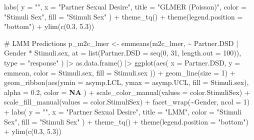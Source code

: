 \documentclass[
  bookmarksnumbered]{article}
\newenvironment{Shaded}{\begin{snugshade}}{\end{snugshade}}
\newcommand{\AttributeTok}[1]{\textcolor[rgb]{0.80,0.80,0.80}{#1}}
\newcommand{\CommentTok}[1]{\textcolor[rgb]{0.50,0.62,0.50}{#1}}
\newcommand{\ConstantTok}[1]{\textcolor[rgb]{0.86,0.64,0.64}{\textbf{#1}}}
\newcommand{\DecValTok}[1]{\textcolor[rgb]{0.86,0.86,0.80}{#1}}
\newcommand{\FloatTok}[1]{\textcolor[rgb]{0.75,0.75,0.82}{#1}}
\newcommand{\FunctionTok}[1]{\textcolor[rgb]{0.94,0.94,0.56}{#1}}
\newcommand{\NormalTok}[1]{\textcolor[rgb]{0.80,0.80,0.80}{#1}}
\newcommand{\OtherTok}[1]{\textcolor[rgb]{0.94,0.94,0.56}{#1}}
\newcommand{\SpecialCharTok}[1]{\textcolor[rgb]{0.86,0.64,0.64}{#1}}
\newcommand{\StringTok}[1]{\textcolor[rgb]{0.80,0.58,0.58}{#1}}
\begin{document}
\begin{Shaded}
\begin{Highlighting}[]
  \FunctionTok{labs}\NormalTok{(}
    \AttributeTok{y =} \StringTok{""}\NormalTok{, }\AttributeTok{x =} \StringTok{"Partner Sexual Desire"}\NormalTok{,}
    \AttributeTok{title =} \StringTok{"GLMER (Poisson)"}\NormalTok{,}
    \AttributeTok{color =} \StringTok{"Stimuli Sex"}\NormalTok{, }\AttributeTok{fill =} \StringTok{"Stimuli Sex"}
\NormalTok{  ) }\SpecialCharTok{+}
  \FunctionTok{theme\_tq}\NormalTok{() }\SpecialCharTok{+}
  \FunctionTok{theme}\NormalTok{(}\AttributeTok{legend.position =} \StringTok{"bottom"}\NormalTok{) }\SpecialCharTok{+}
  \FunctionTok{ylim}\NormalTok{(}\FunctionTok{c}\NormalTok{(}\FloatTok{0.3}\NormalTok{, }\FloatTok{5.3}\NormalTok{))}

\CommentTok{\# LMM Predictions}
\NormalTok{p\_m2c\_lmer }\OtherTok{\textless{}{-}} \FunctionTok{emmeans}\NormalTok{(m2c\_lmer, }\SpecialCharTok{\textasciitilde{}}\NormalTok{ Partner.DSD }\SpecialCharTok{|}\NormalTok{ Gender }\SpecialCharTok{*}\NormalTok{ Stimuli.sex,}
  \AttributeTok{at =} \FunctionTok{list}\NormalTok{(}\AttributeTok{Partner.DSD =} \FunctionTok{seq}\NormalTok{(}\DecValTok{0}\NormalTok{, }\DecValTok{31}\NormalTok{, }\AttributeTok{length.out =} \DecValTok{100}\NormalTok{)),}
  \AttributeTok{type =} \StringTok{"response"}
\NormalTok{) }\SpecialCharTok{|\textgreater{}}
  \FunctionTok{as.data.frame}\NormalTok{() }\SpecialCharTok{|\textgreater{}}
  \FunctionTok{ggplot}\NormalTok{(}\FunctionTok{aes}\NormalTok{(}
    \AttributeTok{x =}\NormalTok{ Partner.DSD, }\AttributeTok{y =}\NormalTok{ emmean,}
    \AttributeTok{color =}\NormalTok{ Stimuli.sex, }\AttributeTok{fill =}\NormalTok{ Stimuli.sex}
\NormalTok{  )) }\SpecialCharTok{+}
  \FunctionTok{geom\_line}\NormalTok{(}\AttributeTok{size =} \DecValTok{1}\NormalTok{) }\SpecialCharTok{+}
  \FunctionTok{geom\_ribbon}\NormalTok{(}\FunctionTok{aes}\NormalTok{(}\AttributeTok{ymin =}\NormalTok{ asymp.LCL, }\AttributeTok{ymax =}\NormalTok{ asymp.UCL, }\AttributeTok{fill =}\NormalTok{ Stimuli.sex),}
    \AttributeTok{alpha =} \FloatTok{0.2}\NormalTok{, }\AttributeTok{color =} \ConstantTok{NA}
\NormalTok{  ) }\SpecialCharTok{+}
  \FunctionTok{scale\_color\_manual}\NormalTok{(}\AttributeTok{values =}\NormalTok{ color.StimuliSex) }\SpecialCharTok{+}
  \FunctionTok{scale\_fill\_manual}\NormalTok{(}\AttributeTok{values =}\NormalTok{ color.StimuliSex) }\SpecialCharTok{+}
  \FunctionTok{facet\_wrap}\NormalTok{(}\SpecialCharTok{\textasciitilde{}}\NormalTok{Gender, }\AttributeTok{ncol =} \DecValTok{1}\NormalTok{) }\SpecialCharTok{+}
  \FunctionTok{labs}\NormalTok{(}
    \AttributeTok{y =} \StringTok{""}\NormalTok{, }\AttributeTok{x =} \StringTok{"Partner Sexual Desire"}\NormalTok{,}
    \AttributeTok{title =} \StringTok{"LMM"}\NormalTok{,}
    \AttributeTok{color =} \StringTok{"Stimuli Sex"}\NormalTok{, }\AttributeTok{fill =} \StringTok{"Stimuli Sex"}
\NormalTok{  ) }\SpecialCharTok{+}
  \FunctionTok{theme\_tq}\NormalTok{() }\SpecialCharTok{+}
  \FunctionTok{theme}\NormalTok{(}\AttributeTok{legend.position =} \StringTok{"bottom"}\NormalTok{) }\SpecialCharTok{+}
  \FunctionTok{ylim}\NormalTok{(}\FunctionTok{c}\NormalTok{(}\FloatTok{0.3}\NormalTok{, }\FloatTok{5.3}\NormalTok{))}


\end{Highlighting}
\end{Shaded}
\end{document}
